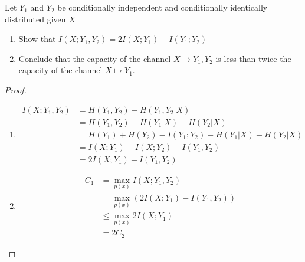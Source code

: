 \begin{exercise}{ Let $Y_{1}$ and $Y_{2}$ be conditionally independent and conditionally identically distributed given $X$
  \begin{enumerate}
    \item Show that $I\left(X ; Y_{1}, Y_{2}\right)=2 I\left(X ; Y_{1}\right)-I\left(Y_{1} ; Y_{2}\right)$
    \item Conclude that the capacity of the channel $X\mapsto Y_1,Y_2$ is less than twice the capacity of the channel $X \mapsto Y_1$.
  \end{enumerate}}
  \begin{proof}
  \par{~}
  \begin{enumerate}
    \item {
      \begin{equation}
        \begin{aligned}
          I(X;Y_1,Y_2) &= H(Y_1,Y_2) - H(Y_1,Y_2|X) \\
          &= H(Y_1,Y_2) - H(Y_1|X) - H(Y_2|X) \\
          &= H(Y_1) + H(Y_2) - I(Y_1;Y_2) -  H(Y_1|X) - H(Y_2|X) \\
          &=I(X;Y_1) + I(X;Y_2)- I(Y_1,Y_2) \\
          &= 2I(X;Y_1) - I(Y_1,Y_2)
        \end{aligned}
      \end{equation}
     }
    \item { 
\begin{equation}
  \begin{aligned}
    C_1 &= \max_{p(x)} I(X;Y_1,Y_2) \\
    &= \max_{p(x)} (2I(X;Y_1) - I(Y_1,Y_2)) \\
    &\le \max_{p(x)} 2I(X;Y_1) \\
    &= 2C_2
  \end{aligned}
\end{equation}
    }
  \end{enumerate}
  \end{proof}
  \label{ex1}
\end{exercise}

